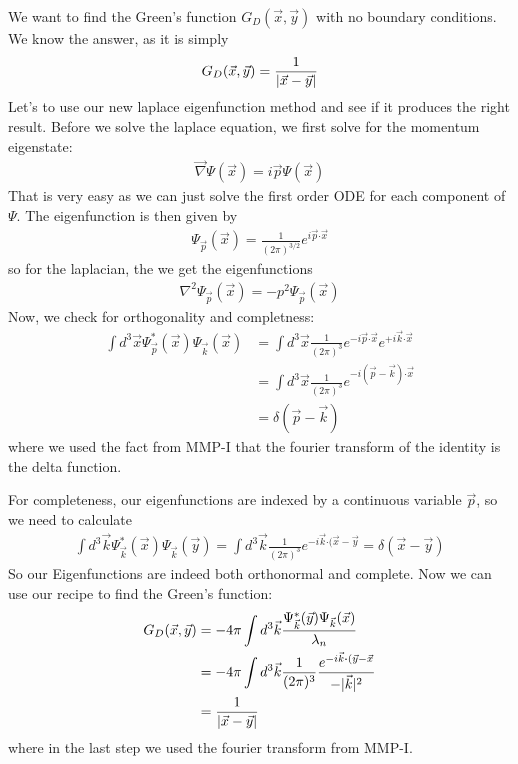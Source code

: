 \begin{ex}
  We want to find the Green's function $G_D(\vec{x},\vec{y})$ with no boundary conditions. We know the answer, as it is simply 
  \begin{align*}
    G_D(\vec{x},\vec{y}) = \frac{1}{\vert\vec{x}- \vec{y}\vert}
  \end{align*}
  Let's to use our new laplace eigenfunction method and see if it produces the right result.
  Before we solve the laplace equation, we first solve for the momentum eigenstate:
  \begin{align*}
    \vec{\nabla}\Psi(\vec{x}) = i \vec{p} \Psi(\vec{x})
  \end{align*}
  That is very easy as we can just solve the first order ODE for each component of $\Psi$.
  The eigenfunction is then given by
  \begin{align*}
    \Psi_{\vec{p}}(\vec{x}) = \frac{1}{(2 \pi)^{3/2}}e^{i \vec{p}\bm{\cdot} \vec{x}}
  \end{align*}
  so for the laplacian, the we get the eigenfunctions 
  \begin{align*}
    \nabla^{2} \Psi_{\vec{p}}(\vec{x}) = -p^{2} \Psi_{\vec{p}}(\vec{x})
  \end{align*}
  Now, we check for orthogonality and completness:
  \begin{align*}
    \int d^{3}\vec{x} \Psi_{\vec{p}}^{\ast}(\vec{x}) \Psi_{\vec{k}}(\vec{x}) 
    &= 
    \int d^{3}\vec{x} \frac{1}{(2 \pi)^{3}}e^{-i \vec{p} \bm{\cdot} \vec{x}} e^{+ i \vec{k} \bm{\cdot} \vec{x}}
    \\
    &= \int d^{3} \vec{x} \frac{1}{(2 \pi)^{3}} e^{-i(\vec{p}- \vec{k})\bm{\cdot} \vec{x}}
    \\
    &=
    \delta(\vec{p} - \vec{k})
  \end{align*}
  where we used the fact from MMP-I that the fourier transform of the identity is the delta function.

  For completeness, our eigenfunctions are indexed by a continuous variable $\vec{p}$, so we need to calculate
  \begin{align*}
    \int d^{3}\vec{k} \Psi_{\vec{k}}^{\ast}(\vec{x}) \Psi_{\vec{k}}(\vec{y})
    =
    \int d^{3}\vec{k} \frac{1}{(2 \pi)^{3}} e^{-i \vec{k} \bm{\cdot}(\vec{x}- \vec{y}} 
    = 
    \delta(\vec{x}-\vec{y})
  \end{align*}
  So our Eigenfunctions are indeed both orthonormal and complete.
  Now we can use our recipe to find the Green's function:
  \begin{align*}
    G_D(\vec{x},\vec{y}) 
    &= 
    - 4 \pi \int d^{3}\vec{k} \frac{\Psi_{\vec{k}}^{\ast}(\vec{y})\Psi_{\vec{k}}(\vec{x})}{\lambda_n}
    \\
    &=
    - 4 \pi \int d^{3}\vec{k} \frac{1}{(2 \pi)^{3}} \frac{e^{-i \vec{k} \bm{\cdot}(\vec{y} - \vec{x}}}{- \vert\vec{k}\vert^{2}}\\
    &= \frac{1}{\vert\vec{x} - \vec{y}\vert}
  \end{align*}
  where in the last step we used the fourier transform from MMP-I.
\end{ex}
